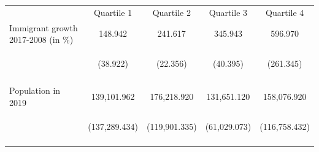 \begin{center}
\begin{tabular}{lcccc}
\hline \noalign{\smallskip} & Quartile 1 & Quartile 2 & Quartile 3 & Quartile 4\\
\noalign{\smallskip}\hline \noalign{\smallskip}Immigrant growth 2017-2008 (in \%) & 148.942 & 241.617 & 345.943 & 596.970\\
 & \begin{footnotesize}(38.922)\end{footnotesize} & \begin{footnotesize}(22.356)\end{footnotesize} & \begin{footnotesize}(40.395)\end{footnotesize} & \begin{footnotesize}(261.345)\end{footnotesize}\\
 & \begin{footnotesize}\end{footnotesize} & \begin{footnotesize}\end{footnotesize} & \begin{footnotesize}\end{footnotesize} & \begin{footnotesize}\end{footnotesize}\\
\noalign{\smallskip}Population in 2019 & 139,101.962 & 176,218.920 & 131,651.120 & 158,076.920\\
 & \begin{footnotesize}(137,289.434)\end{footnotesize} & \begin{footnotesize}(119,901.335)\end{footnotesize} & \begin{footnotesize}(61,029.073)\end{footnotesize} & \begin{footnotesize}(116,758.432)\end{footnotesize}\\
 & \begin{footnotesize}\end{footnotesize} & \begin{footnotesize}\end{footnotesize} & \begin{footnotesize}\end{footnotesize} & \begin{footnotesize}\end{footnotesize}\\

\end{tabular}
\end{center}
